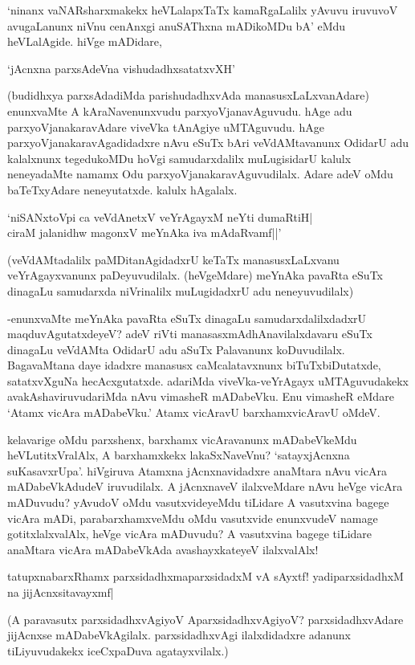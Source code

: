 `ninanx vaNARsharxmakekx heVLalapxTaTx kamaRgaLalilx yAvuvu iruvuvoV avugaLanunx niVnu cenAnxgi anuSAThxna mADikoMDu bA' eMdu heVLalAgide. hiVge mADidare,

\begin{shloka}
`jAcnxna parxsAdeVna vishudadhxsatatxvXH'
\end{shloka}

(budidhxya parxsAdadiMda parishudadhxvAda manasusxLaLxvanAdare) enunxvaMte A kAraNavenunxvudu parxyoVjanavAguvudu. hAge adu parxyoVjanakaravAdare viveVka tAnAgiye uMTAguvudu. hAge parxyoVjanakaravAgadidadxre nAvu eSuTx bAri veVdAMtavanunx OdidarU adu kalalxnunx tegedukoMDu hoVgi samudarxdalilx muLugisidarU kalulx neneyadaMte namamx Odu parxyoVjanakaravAguvudilalx. Adare adeV oMdu baTeTxyAdare neneyutatxde. kalulx hAgalalx.

\begin{shloka}
`niSANxtoV\s pi ca veVdAnetxV veYrAgayxM neYti dumaRtiH|\\
ciraM jalanidhw magonxV meYnAka iva mAdaRvamf||'
\end{shloka}

(veVdAMtadalilx paMDitanAgidadxrU keTaTx manasusxLaLxvanu veYrAgayxvanunx paDeyuvudilalx. (heVgeMdare) meYnAka pavaRta eSuTx dinagaLu samudarxda niVrinalilx muLugidadxrU adu neneyuvudilalx)

-enunxvaMte meYnAka pavaRta eSuTx dinagaLu samudarxdalilxdadxrU maqduvAgutatxdeyeV? adeV riVti manasasxmAdhAnavilalxdavaru eSuTx dinagaLu veVdAMta OdidarU adu aSuTx Palavanunx koDuvudilalx. BagavaMtana daye idadxre manasusx caMcalatavxnunx biTuTxbiDutatxde, satatxvXguNa hecAcxgutatxde. adariMda viveVka-veYrAgayx uMTAguvudakekx avakAshaviruvudariMda nAvu vimasheR mADabeVku. Enu vimasheR eMdare `Atamx vicAra mADabeVku.' Atamx vicAravU barxhamxvicAravU oMdeV.

kelavarige oMdu parxshenx, barxhamx vicAravanunx mADabeVkeMdu heVLutitxVralAlx, A barxhamxkekx lakaSxNaveVnu? `satayxjAcnxna suKasavxrUpa'. hiVgiruva Atamxna jAcnxnavidadxre anaMtara nAvu vicAra mADabeVkAdudeV iruvudilalx. A jAcnxnaveV ilalxveMdare nAvu heVge vicAra mADuvudu? yAvudoV oMdu vasutxvideyeMdu tiLidare A vasutxvina bagege vicAra mADi, parabarxhamxveMdu oMdu vasutxvide enunxvudeV namage gotitxlalxvalAlx, heVge vicAra mADuvudu? A vasutxvina bagege tiLidare anaMtara vicAra mADabeVkAda avashayxkateyeV ilalxvalAlx!

tatupxnabarxRhamx parxsidadhxmaparxsidadxM vA sAyxtf! yadiparxsidadhxM na jijAcnxsitavayxmf|

(A paravasutx parxsidadhxvAgiyoV AparxsidadhxvAgiyoV? parxsidadhxvAdare jijAcnxse mADabeVkAgilalx. parxsidadhxvAgi ilalxdidadxre adanunx tiLiyuvudakekx iceCxpaDuva agatayxvilalx.)

